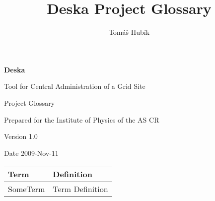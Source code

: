 \documentclass[12pt]{article}
\author{Tomáš Hubík}
\title{Deska Project Glossary}
\begin{document}
{\Huge \textbf{Deska}}

\vspace{0.2in}

{\large Tool for Central Administration of a Grid Site}

\vspace{0.5in}

{\large Project Glossary}

\vspace{0.2in}

{\large Prepared for the Institute of Physics of the AS CR}

\vspace{0.2in}

{\large Version 1.0}

\vspace{0.2in}

{\large Date 2009-Nov-11}

\vspace{0.5in}


\begin{center}
	\begin{tabular}{| p{3.5cm} | p{11.5cm} |}
		\hline
		\textbf{Term} & \textbf{Definition}\\
		\hline
        SomeTerm	& Term Definition\\
		\hline
	\end{tabular}
	\label{tab:ProjectGlossary}
\end{center}
\end{document}
